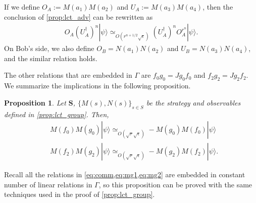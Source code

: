 \documentclass[11pt,letterpaper]{article}
\newcommand{\ket}[1]{|#1\rangle}
\newcommand{\ct}{^{\dagger}}
\newcommand{\1}{\mathbb{1}}
\newcommand{\bS}{\pmb{S}}
\newcommand{\se}{\sqrt{\epsilon}}
\newcommand{\sr}{\sqrt{r}}
\newcommand{\appd}[1]{\simeq_{#1}}
\newtheorem{proposition}[theorem]{Proposition}
\theoremstyle{definition}
\begin{document}
If we define $O_A := M(a_1)M(a_2)$ and $U_A := M(a_3)M(a_4)$, then
the conclusion of \cref{prop:lct_adv} can be rewritten as 
\begin{align*}
	 O_A (U_A\ct)^n \ket{\psi} \appd{O(r^{n+1/2} \se)} (U_A\ct)^n O_A^{r^n} \ket{\psi}.
\end{align*}
On Bob's side, we also define $O_B = N(a_1)N(a_2)$ and $U_B = N(a_3)N(a_4)$, 
and the similar relation holds.

The other relations that are embedded in $\Gamma$ are 
$f_0g_0 = Jg_0f_0$ and $f_2g_2 = Jg_2 f_2$.
We summarize the implications in the following proposition.
\begin{proposition}
	\label{prop:lct_comm}
	Let $\bS$, $\{M(s), N(s)\}_{s \in S}$ be the strategy and observables defined in \cref{prop:lct_group}.
	Then,
	\begin{align}
		&M(f_0)M(g_0) \ket{\psi} \appd{O(\sr \se)} -M(g_0)M(f_0) \ket{\psi} \\
		&M(f_2)M(g_2) \ket{\psi} \appd{O(\sr \se)} -M(g_2)M(f_2) \ket{\psi}.
	\end{align}
\end{proposition}
Recall all the relations in \cref{eq:comm,eq:mg1,eq:mg2} are embedded in constant number of linear relations in $\Gamma$,
so this proposition can be proved with the same techniques used in the proof of \cref{prop:lct_group}.
\end{document}
